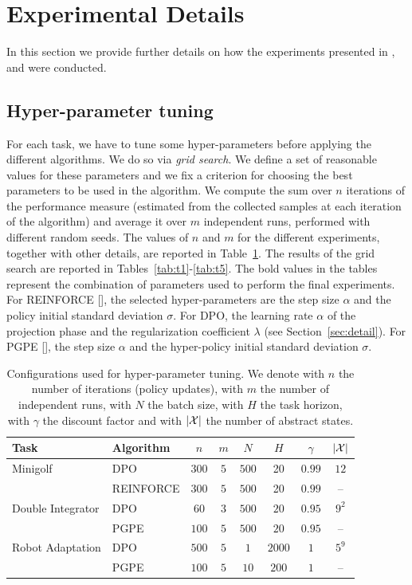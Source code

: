 \section{Experimental Details}\label{sec:exp2}
In this section we provide further details on how the experiments presented in ,  and  were conducted. 

\subsection{Hyper-parameter tuning}
For each task, we have to tune some hyper-parameters before applying the different algorithms. We do so via \emph{grid search}. We define a set of reasonable values for these parameters and we fix a criterion for choosing the best parameters to be used in the algorithm. We compute the sum over $n$ iterations of the performance measure (estimated from the collected samples at each iteration of the algorithm) and average it over $m$ independent runs, performed with different random seeds. 
The values of $n$ and $m$ for the different experiments, together with other details, are reported in Table~\ref{tab:recap1}.
The results of the grid search are reported in Tables~\ref{tab:t1}-\ref{tab:t5}.
The bold values in the tables represent the combination of parameters used to perform the final experiments. For REINFORCE [\cite{williams1992simple}], the selected hyper-parameters are the step size $\alpha$ and the policy initial standard deviation $\sigma$. For \ac{DPO}, the learning rate $\alpha$ of the projection phase and the regularization coefficient $\lambda$ (see Section~\ref{sec:detail}). For \ac{PGPE} [\cite{sehnke2008policy}], the step size $\alpha$ and the hyper-policy initial standard deviation $\sigma$.

\begin{table}[H]
	\centering
	\begin{tabular}{ll|cccccc}
		\toprule
		\textbf{Task} & \textbf{Algorithm} & $n$ & $m$ & $N$ & $H$ & $\gamma$ & $|\mathcal{X}|$\\
		\midrule
		Minigolf & DPO & $300$ & $5$ & $500$ & 20 & $0.99$ & $12$ \\
		& REINFORCE & $300$ & $5$ & $500$ & 20 & $0.99$ & -- \\
		Double Integrator & DPO & $60$ & $3$ & $500$ & $20$ & $0.95$ & $9^{2}$ \\
		& PGPE & $100$ & $5$ & $500$ & $20$ & $0.95$ & -- \\
		Robot Adaptation & DPO & $500$ & $5$ & $1$ & $2000$ & $1$ & $5^{9}$ \\
		& PGPE & $100$ & $5$ & $10$ & $200$ & $1$ & --\\
		\midrule
	\end{tabular}
	\caption{\label{tab:recap1}Configurations used for hyper-parameter tuning. We denote with $n$ the number of iterations (policy updates), with $m$ the number of independent runs, with $N$ the batch size, with $H$ the task horizon, with $\gamma$ the discount factor and with $|\mathcal{X}|$ the number of abstract states.}
\end{table}

